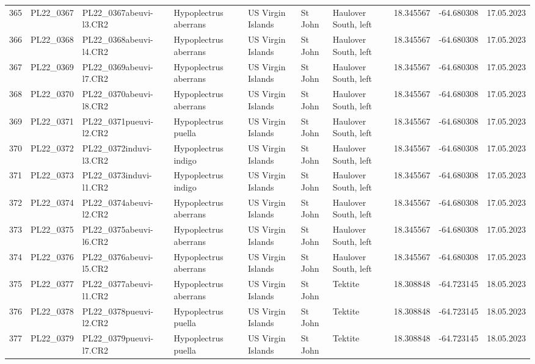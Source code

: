 \begin{table}[ht]
\begin{tabular}{rlllllllll}
  365 & PL22\_0367 & PL22\_0367abeuvi-l3.CR2 & Hypoplectrus aberrans & US Virgin Islands & St John & Haulover South, left & 18.345567 & -64.680308 & 17.05.2023 \\ 
  366 & PL22\_0368 & PL22\_0368abeuvi-l4.CR2 & Hypoplectrus aberrans & US Virgin Islands & St John & Haulover South, left & 18.345567 & -64.680308 & 17.05.2023 \\ 
  367 & PL22\_0369 & PL22\_0369abeuvi-l7.CR2 & Hypoplectrus aberrans & US Virgin Islands & St John & Haulover South, left & 18.345567 & -64.680308 & 17.05.2023 \\ 
  368 & PL22\_0370 & PL22\_0370abeuvi-l8.CR2 & Hypoplectrus aberrans & US Virgin Islands & St John & Haulover South, left & 18.345567 & -64.680308 & 17.05.2023 \\ 
  369 & PL22\_0371 & PL22\_0371pueuvi-l2.CR2 & Hypoplectrus puella & US Virgin Islands & St John & Haulover South, left & 18.345567 & -64.680308 & 17.05.2023 \\ 
  370 & PL22\_0372 & PL22\_0372induvi-l3.CR2 & Hypoplectrus indigo & US Virgin Islands & St John & Haulover South, left & 18.345567 & -64.680308 & 17.05.2023 \\ 
  371 & PL22\_0373 & PL22\_0373induvi-l1.CR2 & Hypoplectrus indigo & US Virgin Islands & St John & Haulover South, left & 18.345567 & -64.680308 & 17.05.2023 \\ 
  372 & PL22\_0374 & PL22\_0374abeuvi-l2.CR2 & Hypoplectrus aberrans & US Virgin Islands & St John & Haulover South, left & 18.345567 & -64.680308 & 17.05.2023 \\ 
  373 & PL22\_0375 & PL22\_0375abeuvi-l6.CR2 & Hypoplectrus aberrans & US Virgin Islands & St John & Haulover South, left & 18.345567 & -64.680308 & 17.05.2023 \\ 
  374 & PL22\_0376 & PL22\_0376abeuvi-l5.CR2 & Hypoplectrus aberrans & US Virgin Islands & St John & Haulover South, left & 18.345567 & -64.680308 & 17.05.2023 \\ 
  375 & PL22\_0377 & PL22\_0377abeuvi-l1.CR2 & Hypoplectrus aberrans & US Virgin Islands & St John & Tektite & 18.308848 & -64.723145 & 18.05.2023 \\ 
  376 & PL22\_0378 & PL22\_0378pueuvi-l2.CR2 & Hypoplectrus puella & US Virgin Islands & St John & Tektite & 18.308848 & -64.723145 & 18.05.2023 \\ 
  377 & PL22\_0379 & PL22\_0379pueuvi-l7.CR2 & Hypoplectrus puella & US Virgin Islands & St John & Tektite & 18.308848 & -64.723145 & 18.05.2023 \\ 

\end{tabular}
\end{table}
